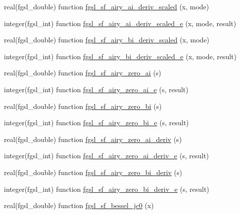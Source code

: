 \begin{DoxyCompactItemize}
\item 
real(fgsl\+\_\+double) function \hyperlink{specfunc_8finc_a62e20904bc1014cdb00b144a19d71a1b}{fgsl\+\_\+sf\+\_\+airy\+\_\+ai\+\_\+deriv\+\_\+scaled} (x, mode)
\item 
integer(fgsl\+\_\+int) function \hyperlink{specfunc_8finc_ac8ac3ea3c8e3eede9394a02664127672}{fgsl\+\_\+sf\+\_\+airy\+\_\+ai\+\_\+deriv\+\_\+scaled\+\_\+e} (x, mode, result)
\item 
real(fgsl\+\_\+double) function \hyperlink{specfunc_8finc_a04ba87efb77bcd09477afa381cc42b83}{fgsl\+\_\+sf\+\_\+airy\+\_\+bi\+\_\+deriv\+\_\+scaled} (x, mode)
\item 
integer(fgsl\+\_\+int) function \hyperlink{specfunc_8finc_a79163f45acbbd01d6a77d2dd3deba867}{fgsl\+\_\+sf\+\_\+airy\+\_\+bi\+\_\+deriv\+\_\+scaled\+\_\+e} (x, mode, result)
\item 
real(fgsl\+\_\+double) function \hyperlink{specfunc_8finc_a923a93771a5ee0e06805113016146e9d}{fgsl\+\_\+sf\+\_\+airy\+\_\+zero\+\_\+ai} (s)
\item 
integer(fgsl\+\_\+int) function \hyperlink{specfunc_8finc_a5233f5c6cac412fb4a24145a1d800dbe}{fgsl\+\_\+sf\+\_\+airy\+\_\+zero\+\_\+ai\+\_\+e} (s, result)
\item 
real(fgsl\+\_\+double) function \hyperlink{specfunc_8finc_ade6dd69303b96c3b449ae37c7c9e776d}{fgsl\+\_\+sf\+\_\+airy\+\_\+zero\+\_\+bi} (s)
\item 
integer(fgsl\+\_\+int) function \hyperlink{specfunc_8finc_a7a902baef34b378f8e8a36093b0f8354}{fgsl\+\_\+sf\+\_\+airy\+\_\+zero\+\_\+bi\+\_\+e} (s, result)
\item 
real(fgsl\+\_\+double) function \hyperlink{specfunc_8finc_afe7e2c7cdad1edb4b04d1375f353c0b1}{fgsl\+\_\+sf\+\_\+airy\+\_\+zero\+\_\+ai\+\_\+deriv} (s)
\item 
integer(fgsl\+\_\+int) function \hyperlink{specfunc_8finc_a4ef02912c6ef5409f4de9651d8471f50}{fgsl\+\_\+sf\+\_\+airy\+\_\+zero\+\_\+ai\+\_\+deriv\+\_\+e} (s, result)
\item 
real(fgsl\+\_\+double) function \hyperlink{specfunc_8finc_ada3f1532d9db39bcd789d2dd8a558b19}{fgsl\+\_\+sf\+\_\+airy\+\_\+zero\+\_\+bi\+\_\+deriv} (s)
\item 
integer(fgsl\+\_\+int) function \hyperlink{specfunc_8finc_a3daa8cdb6f16d461ad5c14f31894b4a9}{fgsl\+\_\+sf\+\_\+airy\+\_\+zero\+\_\+bi\+\_\+deriv\+\_\+e} (s, result)
\item 
real(fgsl\+\_\+double) function \hyperlink{specfunc_8finc_ade323a111e69823d5dc00ff166702be1}{fgsl\+\_\+sf\+\_\+bessel\+\_\+jc0} (x)

\end{DoxyCompactItemize}
